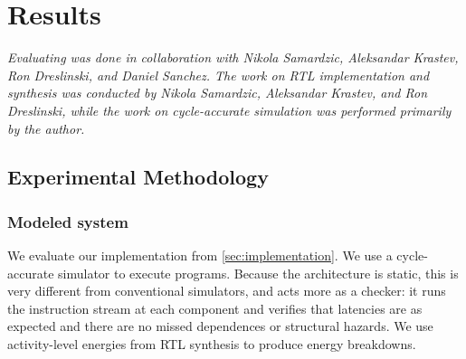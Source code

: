 \chapter{Results}
\label{sec:implementation}

\emph{Evaluating \name was done in collaboration with Nikola Samardzic, Aleksandar Krastev, Ron Dreslinski, and Daniel Sanchez. The work on RTL implementation and synthesis was conducted by Nikola Samardzic, Aleksandar Krastev, and Ron Dreslinski, while the work on cycle-accurate simulation was performed primarily by the author.}\\


\section{Experimental Methodology}

\subsection{Modeled system}
We evaluate our \name implementation from \autoref{sec:implementation}.
We use a cycle-accurate simulator to execute \name programs.
Because the architecture is static, this is very different from conventional simulators,
and acts more as a checker: it runs the instruction stream at each component and verifies
that latencies are as expected and there are no missed dependences or structural hazards.
We use activity-level energies from RTL synthesis to produce energy breakdowns.

